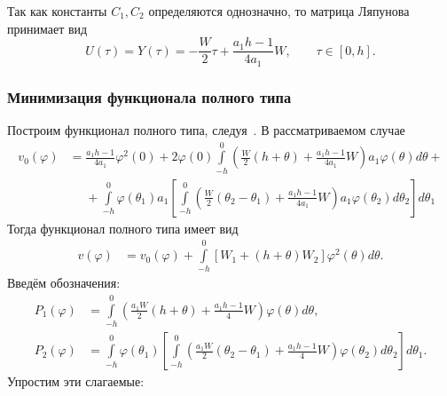 \documentclass[a4paper,14pt]{article}
\begin{document}
Так как константы $C_1, C_2$ определяются однозначно, то матрица
Ляпунова принимает вид~\cite[стр.~49]{kharitonov2013}
\begin{equation*}
  U(\tau) = Y(\tau)
  = - \frac{W}{2} \tau + \frac{a_1 h - 1}{4 a_1} W,
  \qquad \tau \in [0, h].
\end{equation*}

\subsubsection{Минимизация функционала полного типа}
Построим функционал полного типа, следуя~\cite{kharitonov2013}.  В
рассматриваемом случае
\begin{equation*}
  \begin{aligned}
    v_0(\varphi)
    &=
      \frac{a_1 h - 1}{4 a_1} \varphi^2(0)
      + 2 \varphi(0)
      \int\limits_{-h}^0 \left(
      \frac{W}{2} (h + \theta) + \frac{a_1 h - 1}{4a_1} W
      \right) a_1 \varphi(\theta) d\theta + \\
    &\phantom{=}
      + \int\limits_{-h}^0 \varphi(\theta_1) a_1 \left[
      \int\limits_{-h}^0 \left(
      \frac{W}{2} (\theta_2 - \theta_1)
      + \frac{a_1 h - 1}{4 a_1} W
      \right) a_1 \varphi(\theta_2) d\theta_2
      \right] d\theta_1
  \end{aligned}
\end{equation*}
Тогда функционал полного типа имеет вид
\begin{equation*}
  \begin{aligned}
    v(\varphi)
    &=
      v_0(\varphi)
      +
      \int\limits_{-h}^0 \left[
      W_1 + (h + \theta) W_2
      \right] \varphi^2(\theta) d\theta.
  \end{aligned}
\end{equation*}
Введём обозначения:
\begin{equation*}
  \begin{aligned}
    P_1(\varphi)
    &=
      \int\limits_{-h}^0 \left(
      \frac{a_1 W}{2} (h + \theta) + \frac{a_1 h - 1}{4} W
      \right) \varphi(\theta) d\theta, \\
    P_2(\varphi)
    &=
      \int\limits_{-h}^0 \varphi(\theta_1) \left[
      \int\limits_{-h}^0 \left(
      \frac{a_1 W}{2} (\theta_2 - \theta_1)
      + \frac{a_1 h - 1}{4} W
      \right) \varphi(\theta_2) d\theta_2
      \right] d\theta_1.
  \end{aligned}
\end{equation*}
Упростим эти слагаемые:
\end{document}

